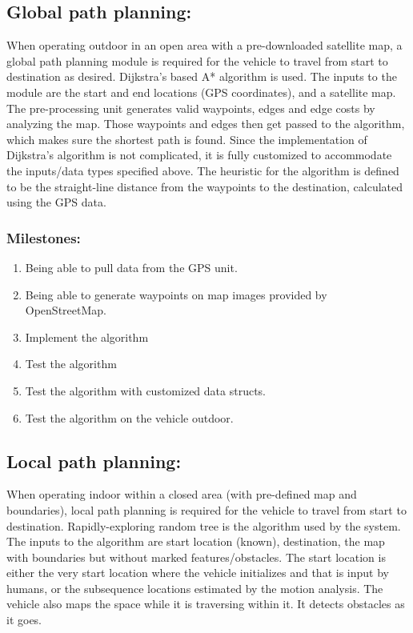 \documentclass[compsoc,draftclsnofoot,onecolumn,10pt]{IEEEtran}
\begin{document}
\subsection{Global path planning:}
When operating outdoor in an open area with a pre-downloaded satellite map, a global path planning module is required for the vehicle to travel from start to destination as desired. Dijkstra's based A* algorithm is used. The inputs to the module are the start and end locations (GPS coordinates), and a satellite map. The pre-processing unit generates valid waypoints, edges and edge costs by analyzing the map. Those waypoints and edges then get passed to the algorithm, which makes sure the shortest path is found. Since the implementation of Dijkstra’s algorithm is not complicated, it is fully customized to accommodate the inputs/data types specified above. The heuristic for the algorithm is defined to be the straight-line distance from the waypoints to the destination, calculated using the GPS data.\par
\subsubsection{Milestones:}
\begin{enumerate}
	\item Being able to pull data from the GPS unit.
	\item Being able to generate waypoints on map images provided by OpenStreetMap.
	\item Implement the algorithm
	\item Test the algorithm
	\item Test the algorithm with customized data structs.
	\item Test the algorithm on the vehicle outdoor.
\end{enumerate}

\subsection{Local path planning:}
When operating indoor within a closed area (with pre-defined map and boundaries), local path planning is required for the vehicle to travel from start to destination. Rapidly-exploring random tree is the algorithm used by the system. The inputs to the algorithm are start location (known), destination, the map with boundaries but without marked features/obstacles. The start location is either the very start location where the vehicle initializes and that is input by humans, or the subsequence locations estimated by the motion analysis. The vehicle also maps the space while it is traversing within it. It detects obstacles as it goes.\par
\end{document}
